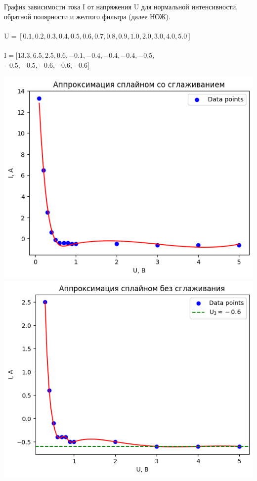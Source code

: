 \documentclass[12pt,openany]{book}
\begin{document}
\noindent График зависимости тока I от напряжения U для нормальной интенсивности, 
обратной полярности и желтого фильтра (далее НОЖ).\\\\
$\text{U} = [0.1, 0.2, 0.3, 0.4, 0.5, 0.6, 0.7, 0.8, 0.9, 1.0, 2.0, 3.0, 4.0, 5.0]$\\\\
$\text{I} = [13.3, 6.5, 2.5, 0.6, -0.1, -0.4, -0.4, -0.4, -0.5,$\\
$ -0.5, -0.5, -0.6, -0.6, -0.6]$\\
\begin{center}
    \includegraphics[scale=0.59]{K4-NRY1} \\

    \includegraphics[scale=0.59]{K4-NRY2} \\
\end{center}
\end{document}
